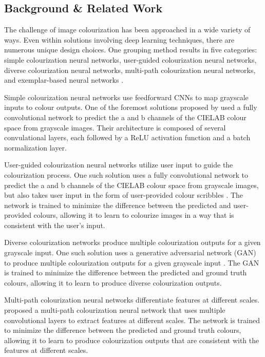 \documentclass{article} %
\begin{document}
\subsection{Background \& Related Work}

The challenge of image colourization has been approached in a wide variety of ways. Even within solutions involving deep learning
techniques, there are numerous unique design choices. One grouping method results in five categories: simple colourization neural networks,
user-guided colourization neural networks, diverse colourization neural networks, multi-path colourization neural networks, and exemplar-based
neural networks \cite{zeger2021grayscale}. 

Simple colourization neural networks use feedforward CNNs to map grayscale inputs to colour outputs. One of the foremost solutions proposed by 
\citet{zhang2016colorful} used a fully convolutional network to predict the a and b channels of the CIELAB colour space from grayscale images. Their 
architecture is composed of several convulational layers, each followed by a ReLU activation function and a batch normalization layer.

User-guided colourization neural networks utilize user input to guide the colourization process. One such solution uses a
fully convolutional network to predict the a and b channels of the CIELAB colour space from grayscale images, but also takes user input in the form of
user-provided colour scribbles \cite{zhang2017real}. The network is trained to minimize the difference between the predicted and user-provided colours, allowing it to
learn to colourize images in a way that is consistent with the user's input. 

Diverse colourization networks produce multiple colourization outputs for a given grayscale input. One such solution uses
a generative adversarial network (GAN) to produce multiple colourization outputs for a given grayscale input \cite{Vitoria2020ChromaGAN}. The GAN is trained to minimize the difference
between the predicted and ground truth colours, allowing it to learn to produce diverse colourization outputs. 

Multi-path colourization neural networks differentiate features at different scales. \citet{Iizuka2016Colourization} proposed a multi-path
colourization neural network that uses multiple convolutional layers to extract features at different scales. The network is trained to minimize the difference
between the predicted and ground truth colours, allowing it to learn to produce colourization outputs that are consistent with the features at different scales. 
\end{document}
